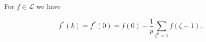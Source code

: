 For $f \in \mathcal{L}$ we have

$$f^*(k) = f^*(0) = f(0) - \frac{1}{p} \sum_{\zeta^p = 1} f(\zeta - 1).$$
